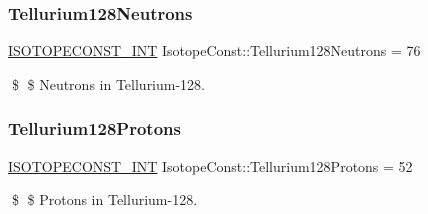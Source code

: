 \subsubsection{\texorpdfstring{Tellurium128\+Neutrons}{Tellurium128Neutrons}}
{\footnotesize\ttfamily \mbox{\hyperlink{group___isotope_const-_macros_ga5f18360b3e99483a35c32d789e62621c}{I\+S\+O\+T\+O\+P\+E\+C\+O\+N\+S\+T\+\_\+\+I\+NT}} Isotope\+Const\+::\+Tellurium128\+Neutrons = 76}

\$ \$ Neutrons in Tellurium-\/128. \mbox{\label{group___isotope_const-_tellurium-_te128_gae7e87c1dd3b1770cafd7445113af530f}} 
\subsubsection{\texorpdfstring{Tellurium128\+Protons}{Tellurium128Protons}}
{\footnotesize\ttfamily \mbox{\hyperlink{group___isotope_const-_macros_ga5f18360b3e99483a35c32d789e62621c}{I\+S\+O\+T\+O\+P\+E\+C\+O\+N\+S\+T\+\_\+\+I\+NT}} Isotope\+Const\+::\+Tellurium128\+Protons = 52}

\$ \$ Protons in Tellurium-\/128. 